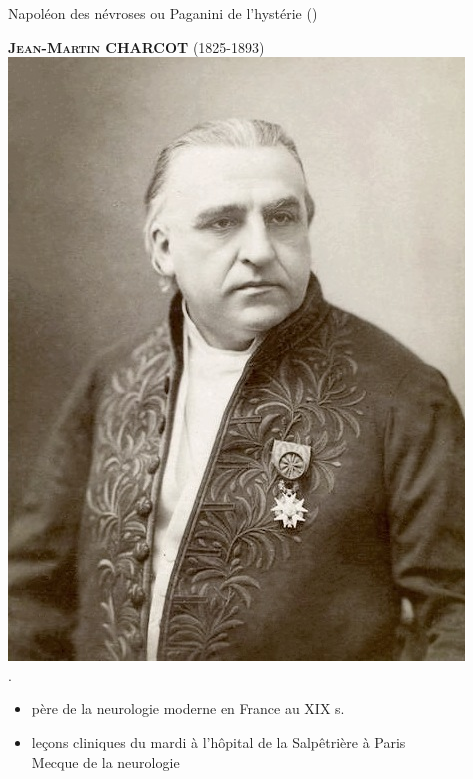 \begin{frame}{\og{}Napoléon des névroses\fg{} ou \og{}Paganini de l'hystérie\fg{} {\small(\hypersetup{citecolor=yellow}\cite{marmion2015freud})}}

\textsc{\textcolor{deepblue}{\textbf{Jean-Martin CHARCOT}} (1825-1893)} 
\hbox{\hspace{10.3em} \includegraphics[scale=0.06]{pic/Jean-Martin_Charcot.jpg}}\\\hbox{.} \pause
\begin{itemize}[<+->]
\item père de la neurologie moderne en France au XIX\ieme{} s. 
\item leçons cliniques du mardi à l'hôpital de la Salpêtrière à Paris \\
\hspace{165pt}
\footnotesize\og{}Mecque de la neurologie\fg{}
\end{itemize}


\end{frame}
